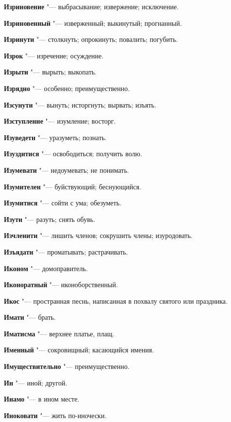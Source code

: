 \begin{mymulticols}
\noindent\textbf{Изриновение} "--- выбрасывание; извержение; исключение. 

\noindent\textbf{Изриновенный} "--- изверженный; выкинутый; прогнанный. 

\noindent\textbf{Изринути} "--- столкнуть; опрокинуть; повалить; погубить. 

\noindent\textbf{Изрок} "--- изречение; осуждение. 

\noindent\textbf{Изрыти} "--- вырыть; выкопать. 

\noindent\textbf{Изрядно} "--- особенно; преимущественно. 

\noindent\textbf{Изсунути} "--- вынуть; исторгнуть; вырвать; изъять. 

\noindent\textbf{Изступление} "--- изумление; восторг. 

\noindent\textbf{Изуведети} "--- уразуметь; познать. 

\noindent\textbf{Изуздитися} "--- освободиться; получить волю. 

\noindent\textbf{Изумевати} "--- недоумевать; не понимать. 

\noindent\textbf{Изумителен} "--- буйствующий; беснующийся. 

\noindent\textbf{Изумитися} "--- сойти с ума; обезуметь. 

\noindent\textbf{Изути} "--- разуть; снять обувь. 

\noindent\textbf{Изчленити} "--- лишить членов; сокрушить члены; изуродовать. 

\noindent\textbf{Изъядати} "--- проматывать; растрачивать. 

\noindent\textbf{Иконом} "--- домоправитель. 

\noindent\textbf{Иконоратный} "--- иконоборственный. 

\noindent\textbf{Икос} "--- пространная песнь, написанная в похвалу святого или праздника. 

\noindent\textbf{Имати} "--- брать. 

\noindent\textbf{Иматисма} "--- верхнее платье, плащ. 

\noindent\textbf{Именный} "--- сокровищный; касающийся имения. 

\noindent\textbf{Имуществительно} "--- преимущественно. 

\noindent\textbf{Ин} "--- иной; другой. 

\noindent\textbf{Инамо} "--- в ином месте. 

\noindent\textbf{Иноковати} "--- жить по-иночески. 


\end{mymulticols}
